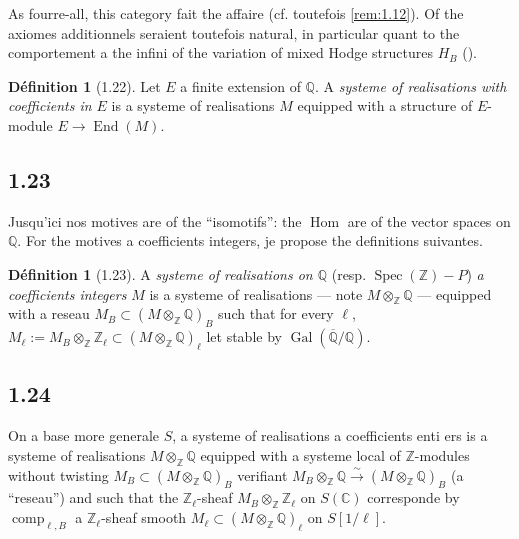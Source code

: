\documentclass[12pt,a4paper]{article}
\theoremstyle{plain}
\theoremstyle{definition}
\newtheorem{definition}[theorem]{D\'efinition}
\theoremstyle{remark}
\DeclareMathOperator{\Spec}{Spec}
\DeclareMathOperator{\Hom}{Hom}
\DeclareMathOperator{\End}{End}
\DeclareMathOperator{\Gal}{Gal}
\providecommand{\Hom}{\operatorname{Hom}}
\providecommand{\End}{\operatorname{End}}
\providecommand{\Gal}{\operatorname{Gal}}
\providecommand{\Spec}{\operatorname{Spec}}
\providecommand{\comp}{\operatorname{comp}}
\begin{document}
As fourre-all, this category fait the affaire (cf. toutefois \ref{rem:1.12}). Of the
axiomes additionnels seraient toutefois natural, in particular quant to the comportement a
the infini of the variation of mixed Hodge structures $H_B$ (\cite{SZ}).

\begin{definition}[1.22]\label{def:1.22}
Let $E$ a finite extension of $\mathbb{Q}$. A \emph{systeme of realisations with coefficients in $E$} is a systeme of realisations $M$ equipped with a structure of
$E$-module $E \to \End(M)$.
\end{definition}

\subsection*{1.23}

Jusqu'ici nos motives are of the ``isomotifs'': the $\Hom$ are of the vector spaces on
$\mathbb{Q}$. For the motives a coefficients integers, je propose the definitions
suivantes.

\begin{definition}[1.23]\label{def:1.23}
A \emph{systeme of realisations on $\mathbb{Q}$} (resp.
$\Spec(\mathbb{Z}) - P$) \emph{a coefficients integers} $M$ is a systeme of
realisations --- note $M \otimes_{\mathbb{Z}} \mathbb{Q}$ --- equipped with a reseau
$M_B \subset (M \otimes_{\mathbb{Z}} \mathbb{Q})_B$ such that for every $\ell$,
$M_\ell := M_B \otimes_{\mathbb{Z}} \mathbb{Z}_\ell \subset (M \otimes_{\mathbb{Z}}
\mathbb{Q})_\ell$ let stable by $\Gal(\overline{\mathbb{Q}}/\mathbb{Q})$.
\end{definition}

\subsection*{1.24}

On a base more generale $S$, a systeme of realisations a coefficients
enti ers is a systeme of realisations $M \otimes_{\mathbb{Z}} \mathbb{Q}$ equipped with a
systeme local of $\mathbb{Z}$-modules without twisting $M_B \subset (M \otimes_{\mathbb{Z}}
\mathbb{Q})_B$ verifiant $M_B \otimes_{\mathbb{Z}} \mathbb{Q} \xrightarrow{\sim} (M
\otimes_{\mathbb{Z}} \mathbb{Q})_B$ (a ``reseau'') and such that the
$\mathbb{Z}_\ell$-sheaf $M_B \otimes_{\mathbb{Z}} \mathbb{Z}_\ell$ on $S(\mathbb{C})$
corresponde by $\comp_{\ell,B}$ a $\mathbb{Z}_\ell$-sheaf smooth $M_\ell \subset
(M \otimes_{\mathbb{Z}} \mathbb{Q})_\ell$ on $S[1/\ell]$.
\end{document}

